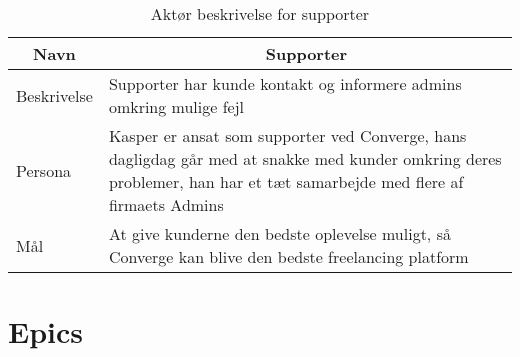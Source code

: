 \begin{table}[H]
    \begin{small}
        \caption{Aktør beskrivelse for supporter}
        \label{tab:supporter}
        \begin{center}
            \begin{tabular}[c]{p{3cm}|p{8cm}}
                \multicolumn{1}{c|}{\textbf{Navn}} & \multicolumn{1}{c}{\textbf{Supporter}}                                                                                                                                                            \\
                \hline
                Beskrivelse                        & \multicolumn{1}{p{10cm}}{Supporter har kunde kontakt og informere admins omkring mulige fejl}                                                                                                     \\
                \hline
                Persona                            & \multicolumn{1}{p{10cm}}{Kasper er ansat som supporter ved Converge, hans dagligdag går med at snakke med kunder omkring deres problemer, han har et tæt samarbejde med flere af firmaets Admins} \\
                \hline
                Mål                                & \multicolumn{1}{p{10cm}}{At give kunderne den bedste oplevelse muligt, så Converge kan blive den bedste freelancing platform}                                                                     \\
            \end{tabular}
        \end{center}
    \end{small}
\end{table}

\section{Epics}

